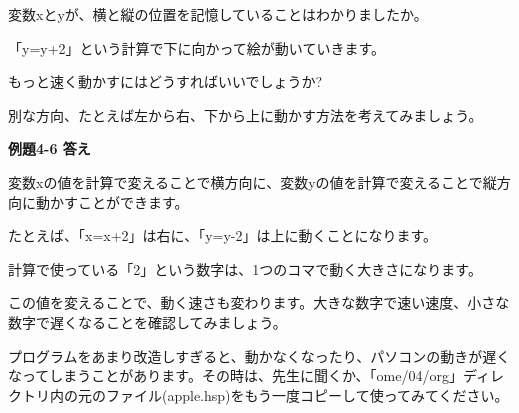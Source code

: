 \documentclass[a4paper,dvipdfmx]{jarticle}
\begin{document}
\bigskip


\bigskip


\bigskip


\bigskip


\bigskip


\bigskip


\bigskip


\bigskip


\bigskip


\bigskip


\bigskip


\bigskip


\bigskip


\bigskip


\bigskip


\bigskip


\bigskip


\bigskip


\bigskip


\bigskip

変数xとyが、横と縦の位置を記憶していることはわかりましたか。

「y=y+2」という計算で下に向かって絵が動いていきます。

もっと速く動かすにはどうすればいいでしょうか?

別な方向、たとえば左から右、下から上に動かす方法を考えてみましょう。


\bigskip


\bigskip


\bigskip

{\bfseries
例題4-6 答え}


\bigskip

変数xの値を計算で変えることで横方向に、変数yの値を計算で変えることで縦方向に動かすことができます。

たとえば、「x=x+2」は右に、「y=y-2」は上に動くことになります。

計算で使っている「2」という数字は、1つのコマで動く大きさになります。

この値を変えることで、動く速さも変わります。大きな数字で速い速度、小さな数字で遅くなることを確認してみましょう。


\bigskip

プログラムをあまり改造しすぎると、動かなくなったり、パソコンの動きが遅くなってしまうことがあります。その時は、先生に聞くか、「ome/04/org」ディレクトリ内の元のファイル(apple.hsp)をもう一度コピーして使ってみてください。


\bigskip


\bigskip
\end{document}
